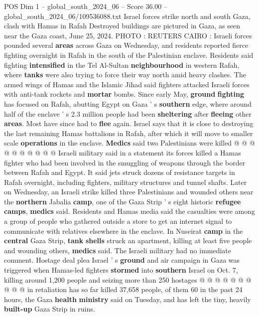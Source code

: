 \begin{textsample}{POS Dim 1 – global\_south\_2024\_06 – Score 36.00 – global\_south\_2024\_06/109536088.txt}  \label{ex:f1_pos_044}
Israel forces strike north and south Gaza, clash with Hamas in Rafah Destroyed buildings are pictured in Gaza, as seen near the Gaza coast, June 25, 2024.
PHOTO : REUTERS CAIRO : Israeli forces pounded several \textbf{areas} across Gaza on Wednesday, and residents reported fierce fighting overnight in Rafah in the south of the Palestinian enclave.
Residents said fighting \textbf{intensified} in the Tel Al-Sultan \textbf{neighbourhood} in western Rafah, where \textbf{tanks} were also trying to force their way north amid heavy clashes.
The armed wings of Hamas and the Islamic Jihad said fighters attacked Israeli forces with anti-tank rockets and \textbf{mortar} bombs.
Since early May, \textbf{ground} \textbf{fighting} has focused on Rafah, abutting Egypt on Gaza ' s \textbf{southern} edge, where around half of the enclave ' s 2.3 million people had been \textbf{sheltering} after \textbf{fleeing} other \textbf{areas}.
Most have since had to \textbf{flee} again.
Israel says that it is close to destroying the last remaining Hamas battalions in Rafah, after which it will move to smaller scale \textbf{operations} in the enclave. \textbf{Medics} said two Palestinians were killed @ @ @ @ @ @ @ @ @ @ Israeli military said in a statement its forces killed a Hamas fighter who had been involved in the smuggling of weapons through the border between Rafah and Egypt.
It said jets struck dozens of resistance targets in Rafah overnight, including fighters, military structures and tunnel shafts.
Later on Wednesday, an Israeli strike killed three Palestinians and wounded others near the \textbf{northern} Jabalia \textbf{camp}, one of the Gaza Strip ' s eight historic \textbf{refugee} \textbf{camps}, \textbf{medics} said.
Residents and Hamas media said the casualties were among a group of people who gathered outside a store to get an internet signal to communicate with relatives elsewhere in the enclave.
In Nuseirat \textbf{camp} in the \textbf{central} Gaza Strip, \textbf{tank} \textbf{shells} struck an apartment, killing at least five people and wounding others, \textbf{medics} said.
The Israeli military had no immediate comment.
Hostage deal plea Israel ' s \textbf{ground} and air campaign in Gaza was triggered when Hamas-led fighters \textbf{stormed} into \textbf{southern} Israel on Oct. 7, killing around 1,200 people and seizing more than 250 hostages @ @ @ @ @ @ @ @ @ @ in retaliation has so far killed 37,658 people, of them 60 in the past 24 hours, the Gaza \textbf{health} \textbf{ministry} said on Tuesday, and has left the tiny, heavily \textbf{built-up} Gaza Strip in ruins.

\end{textsample}
